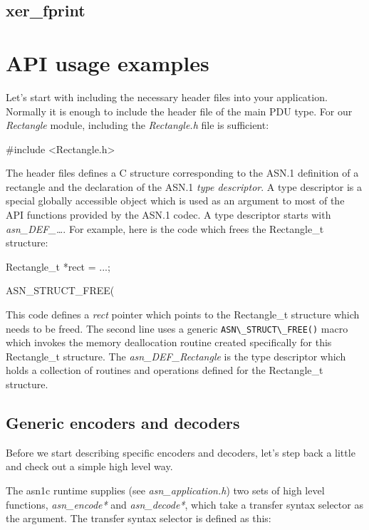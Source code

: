 \documentclass[english,oneside,12pt]{book}
\newcommand{\code}[1]{\lstinline{#1}}
\begin{document}
\section{xer\_fprint}

\chapter{API usage examples}

Let's start with including the necessary header files into your
application. Normally it is enough to include the header file of
the main PDU type. For our \emph{Rectangle} module, including the \emph{Rectangle.h} file is sufficient:
\begin{codesample}
#include <Rectangle.h>
\end{codesample}
The header files defines a C structure corresponding to the ASN.1
definition of a rectangle and the declaration of the ASN.1
\emph{type descriptor}. A type descriptor is a special globally accessible
object which is used as an argument to most of the API functions provided by
the ASN.1 codec. A type descriptor starts with \emph{asn\_DEF\_\ldots{}}. For example, here is the code which frees the Rectangle\_t structure:
\begin{codesample}
Rectangle_t *rect = ...;

ASN_STRUCT_FREE(%
\end{codesample}
This code defines a \emph{rect} pointer which points to the Rectangle\_t
structure which needs to be freed. The second line uses a generic
\code{ASN\_STRUCT\_FREE()} macro which invokes the memory deallocation routine
created specifically for this Rectangle\_t structure.
The \emph{asn\_DEF\_Rectangle} is the type descriptor which holds
a collection of routines and operations defined for the Rectangle\_t structure.

\section{\label{sec:Generic-Encoding}Generic encoders and decoders}

Before we start describing specific encoders and decoders, let's step back
a little and check out a simple high level way.

The asn1c runtime supplies (see \emph{asn\_application.h}) two sets of high level functions, \emph{asn\_encode*} and \emph{asn\_decode*}, which take a transfer syntax selector as the argument. The transfer syntax selector is defined as this:
\end{document}
